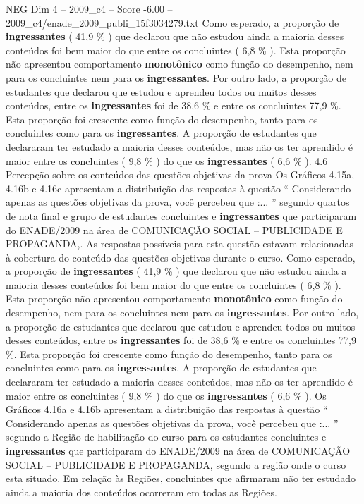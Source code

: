 \begin{textsample}{NEG Dim 4 – 2009\_c4 – Score -6.00 – 2009\_c4/enade\_2009\_publi\_15f3034279.txt}
Como esperado, a proporção de \textbf{ingressantes} ( 41,9 \% ) que declarou que não estudou ainda a maioria desses conteúdos foi bem maior do que entre os concluintes ( 6,8 \% ).
Esta proporção não apresentou comportamento \textbf{monotônico} como função do desempenho, nem para os concluintes nem para os \textbf{ingressantes}.
Por outro lado, a proporção de estudantes que declarou que estudou e aprendeu todos ou muitos desses conteúdos, entre os \textbf{ingressantes} foi de 38,6 \% e entre os concluintes 77,9 \%.
Esta proporção foi crescente como função do desempenho, tanto para os concluintes como para os \textbf{ingressantes}.
A proporção de estudantes que declararam ter estudado a maioria desses conteúdos, mas não os ter aprendido é maior entre os concluintes ( 9,8 \% ) do que os \textbf{ingressantes} ( 6,6 \% ). 4.6 Percepção sobre os conteúdos das questões objetivas da prova Os Gráficos 4.15a, 4.16b e 4.16c apresentam a distribuição das respostas à questão “ Considerando apenas as questões objetivas da prova, você percebeu que :... ” segundo quartos de nota final e grupo de estudantes concluintes e \textbf{ingressantes} que participaram do ENADE/2009 na área de COMUNICAÇÃO SOCIAL – PUBLICIDADE E PROPAGANDA,.
As respostas possíveis para esta questão estavam relacionadas à cobertura do conteúdo das questões objetivas durante o curso.
Como esperado, a proporção de \textbf{ingressantes} ( 41,9 \% ) que declarou que não estudou ainda a maioria desses conteúdos foi bem maior do que entre os concluintes ( 6,8 \% ).
Esta proporção não apresentou comportamento \textbf{monotônico} como função do desempenho, nem para os concluintes nem para os \textbf{ingressantes}.
Por outro lado, a proporção de estudantes que declarou que estudou e aprendeu todos ou muitos desses conteúdos, entre os \textbf{ingressantes} foi de 38,6 \% e entre os concluintes 77,9 \%.
Esta proporção foi crescente como função do desempenho, tanto para os concluintes como para os \textbf{ingressantes}.
A proporção de estudantes que declararam ter estudado a maioria desses conteúdos, mas não os ter aprendido é maior entre os concluintes ( 9,8 \% ) do que os \textbf{ingressantes} ( 6,6 \% ).
Os Gráficos 4.16a e 4.16b apresentam a distribuição das respostas à questão “ Considerando apenas as questões objetivas da prova, você percebeu que :... ” segundo a Região de habilitação do curso para os estudantes concluintes e \textbf{ingressantes} que participaram do ENADE/2009 na área de COMUNICAÇÃO SOCIAL – PUBLICIDADE E PROPAGANDA, segundo a região onde o curso esta situado.
Em relação às Regiões, concluintes que afirmaram não ter estudado ainda a maioria dos conteúdos ocorreram em todas as Regiões.

\end{textsample}
